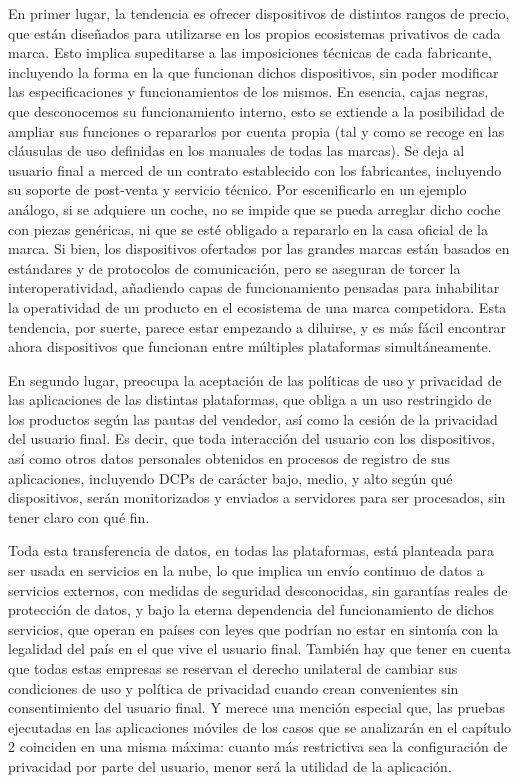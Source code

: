 En primer lugar, la tendencia es ofrecer dispositivos de distintos rangos de precio, que están diseñados para utilizarse en los propios ecosistemas privativos de cada marca. Esto implica supeditarse a las imposiciones técnicas de cada fabricante, incluyendo la forma en la que funcionan dichos dispositivos, sin poder modificar las especificaciones y funcionamientos de los mismos. En esencia, cajas negras, que desconocemos su funcionamiento interno, esto se extiende a la posibilidad de ampliar sus funciones o repararlos por cuenta propia (tal y como se recoge en las cláusulas de uso definidas en los manuales de todas las marcas). Se deja al usuario final a merced de un contrato establecido con los fabricantes, incluyendo su soporte de post-venta y servicio técnico. Por escenificarlo en un ejemplo análogo, si se adquiere un coche, no se impide que se pueda arreglar dicho coche con piezas genéricas, ni que se esté obligado a repararlo en la casa oficial de la marca. Si bien, los dispositivos ofertados por las grandes marcas están basados en estándares y de protocolos de comunicación, pero se aseguran de torcer la interoperatividad, añadiendo capas de funcionamiento pensadas para inhabilitar la operatividad de un producto en el ecosistema de una marca competidora. Esta tendencia, por suerte, parece estar empezando a diluirse, y es más fácil encontrar ahora dispositivos que funcionan entre múltiples plataformas simultáneamente.

\vspace{1cm}

En segundo lugar, preocupa la aceptación de las políticas de uso y privacidad de las aplicaciones de las distintas plataformas, que obliga a un uso restringido de los productos según las pautas del vendedor, así como la cesión de la privacidad del usuario final. Es decir, que toda interacción del usuario con los dispositivos, así como otros datos personales obtenidos en procesos de registro de sus aplicaciones, incluyendo DCPs de carácter bajo, medio, y alto según qué dispositivos, serán monitorizados y enviados a servidores para ser procesados, sin tener claro con qué fin.

\vspace{1cm}

Toda esta transferencia de datos, en todas las plataformas, está planteada para ser usada en servicios en la nube, lo que implica un envío continuo de datos a servicios externos, con medidas de seguridad desconocidas, sin garantías reales de protección de datos, y bajo la eterna dependencia del funcionamiento de dichos servicios, que operan en países con leyes que podrían no estar en sintonía con la legalidad del país en el que vive el usuario final. También hay que tener en cuenta que todas estas empresas se reservan el derecho unilateral de cambiar sus condiciones de uso y política de privacidad cuando crean convenientes sin consentimiento del usuario final. Y merece una mención especial que, las pruebas ejecutadas en las aplicaciones móviles de los casos que se analizarán en el capítulo 2 coinciden en una misma máxima: cuanto más restrictiva sea la configuración de privacidad por parte del usuario, menor será la utilidad de la aplicación.

